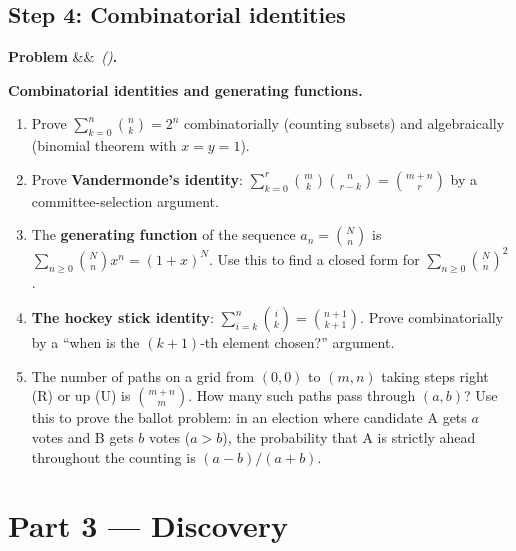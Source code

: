 \documentclass[12pt, a4paper]{article}
\newcounter{problem}
\newenvironment{problem}[1][]{%
  \refstepcounter{problem}%
  \par\vspace{6pt}%
  \noindent\textbf{\color{MidBlue}Problem \theproblem}%
  \ifx&#1&\else\ \textit{(#1)}\fi\textbf{.}\enskip
}{\par\vspace{4pt}}
\begin{document}
\subsection{Step 4: Combinatorial identities}

\begin{problem}
\label{prob:identities}
\textbf{Combinatorial identities and generating functions.}
\begin{enumerate}[label=(\alph*),topsep=2pt]
  \item Prove $\sum_{k=0}^n\binom{n}{k}=2^n$ combinatorially (counting subsets) and algebraically (binomial theorem with $x=y=1$).
  \item Prove \textbf{Vandermonde's identity}: $\sum_{k=0}^r\binom{m}{k}\binom{n}{r-k}=\binom{m+n}{r}$ by a committee-selection argument.
  \item The \textbf{generating function} of the sequence $a_n=\binom{N}{n}$ is $\sum_{n\geq 0}\binom{N}{n}x^n=(1+x)^N$. Use this to find a closed form for $\sum_{n\geq 0}\binom{N}{n}^2$.
  \item \textbf{The hockey stick identity}: $\sum_{i=k}^n\binom{i}{k}=\binom{n+1}{k+1}$. Prove combinatorially by a ``when is the $(k+1)$-th element chosen?'' argument.
  \item The number of paths on a grid from $(0,0)$ to $(m,n)$ taking steps right (R) or up (U) is $\binom{m+n}{m}$. How many such paths pass through $(a,b)$? Use this to prove the ballot problem: in an election where candidate A gets $a$ votes and B gets $b$ votes ($a>b$), the probability that A is strictly ahead throughout the counting is $(a-b)/(a+b)$.
\end{enumerate}
\end{problem}

\section{Part 3 \texorpdfstring{---}{--} Discovery}
\end{document}
